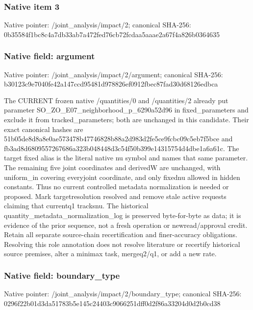 \documentclass[10pt,a4paper]{article}
\begin{document}
\subsubsection{Native item 3}
Native pointer: /joint\_\allowbreak{}analysis/impact/2; canonical SHA-256: 0b35584f1bc8c4a7db33ab7a472fed76cb72fcdaa5aaae2a67f4a826b0364635

\subsubsection{Native field: argument}
Native pointer: /joint\_\allowbreak{}analysis/impact/2/argument; canonical SHA-256: b30123c9e7040fe42a147ccd95481d978826ef0912fbec87fad30d68126edbca

\begingroup\raggedright\sloppy The CURRENT frozen native /\allowbreak{}quantities/\allowbreak{}0 and /\allowbreak{}quantities/\allowbreak{}2 already put parameter SO\_\allowbreak{}ZO\_\allowbreak{}E07\_\allowbreak{}neighborhood\_\allowbreak{}p\_\allowbreak{}6290a52d96 in fixed\_\allowbreak{}parameters and exclude it from tracked\_\allowbreak{}parameters;\allowbreak{} both are unchanged in this candidate. Their exact canonical hashes are 51b05de8d8a8e0ae573478b47746828b88a2d983d2fe5ce9fcbc09c5eb7f5bce and fb3ad8d6809557267686a323b048448d3c54f50b399e14315754d4dbe1a6a61c. The target fixed alias is the literal native nu symbol and names that same parameter. The remaining five joint coordinates and derivedW are unchanged,\allowbreak{} with uniform\_\allowbreak{}in covering everyjoint coordinate,\allowbreak{} and only fixednu allowed in hidden constants. Thus no current controlled metadata normalization is needed or proposed. Mark targetresolution resolved and remove stale active requests claiming that currentq1 tracksnu. The historical quantity\_\allowbreak{}metadata\_\allowbreak{}normalization\_\allowbreak{}log is preserved byte-for-byte as data;\allowbreak{} it is evidence of the prior sequence,\allowbreak{} not a fresh operation or newread/\allowbreak{}approval credit. Retain all separate source-chain recertification and finer-accuracy obligations. Resolving this role annotation does not resolve literature or recertify historical source premises,\allowbreak{} alter a minimax task,\allowbreak{} mergeq2/\allowbreak{}q1,\allowbreak{} or add a new rate.\par\endgroup

\subsubsection{Native field: boundary\_\allowbreak{}type}
Native pointer: /joint\_\allowbreak{}analysis/impact/2/boundary\_\allowbreak{}type; canonical SHA-256: 0296f22b01d3da51783b5e145c24403c9066251dff0d2f86a33204d0d2b0cd38
\end{document}
